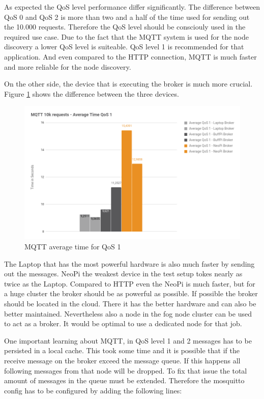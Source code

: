 As expected the \ac{QoS} level performance differ significantly.
The difference between \ac{QoS} 0 and \ac{QoS} 2 is more than two and a half of the time used for sending out the 10.000 requests.
Therefore the \ac{QoS} level should be consciouly used in the required use case.
Due to the fact that the MQTT system is used for the node discovery a lower \ac{QoS} level is suiteable.
\ac{QoS} level 1 is recommended for that application.
And even compared to the \ac{HTTP} connection, MQTT is much faster and more reliable for the node discovery.

On the other side, the device that is executing the broker is much more crucial.
Figure \ref{fig:performance_mqtt_average_time_qos_1} shows the difference between the three devices.

\begin{figure}[H]
    \centering
    \includegraphics[width=\textwidth]{resources/images/performance_mqtt_average_time_qos_1.png}
    \caption[MQTT average time for QoS 1]{MQTT average time for QoS 1}
    \label{fig:performance_mqtt_average_time_qos_1}
\end{figure}

The Laptop that has the most powerful hardware is also much faster by sending out the messages.
NeoPi the weakest device in the test setup tokes nearly as twice as the Laptop.
Compared to \ac{HTTP} even the NeoPi is much faster, but for a huge cluster the broker should be as powerful as possible.
If possible the broker should be located in the cloud.
There it has the better hardware and can also be better maintained.
Nevertheless also a node in the fog node cluster can be used to act as a broker.
It would be optimal to use a dedicated node for that job.

One important learning about MQTT, in \ac{QoS} level 1 and 2 messages has to be persisted in a local cache.
This took some time and it is possible that if the receive message on the broker exceed the message queue.
If this happens all following messages from that node will be dropped.
To fix that issue the total amount of messages in the queue must be extended.
Therefore the mosquitto config has to be configured by adding the following lines:


